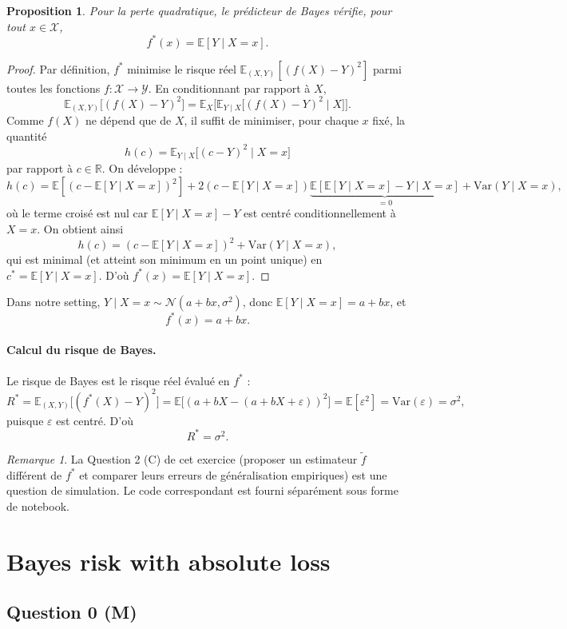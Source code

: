 \documentclass[11pt]{article}
\newtheorem{proposition}{Proposition}
\theoremstyle{remark}
\newtheorem*{remark}{Remarque}
\newcommand{\X}{\mathcal{X}}
\newcommand{\Y}{\mathcal{Y}}
\newcommand{\E}{\mathbb{E}}
\newcommand{\R}{\mathbb{R}}
\newcommand{\Var}{\mathrm{Var}}
\begin{document}
\begin{proposition}
Pour la perte quadratique, le prédicteur de Bayes vérifie, pour tout $x \in \X$,
\[
  f^*(x) = \E[Y \mid X = x].
\]
\end{proposition}

\begin{proof}
Par définition, $f^*$ minimise le risque réel $\E_{(X,Y)}[(f(X)-Y)^2]$ parmi toutes les fonctions $f : \X \to \Y$. En conditionnant par rapport à $X$,
\[
  \E_{(X,Y)}\big[(f(X)-Y)^2\big] = \E_X\Big[\E_{Y\mid X}\big[(f(X)-Y)^2 \mid X\big]\Big].
\]
Comme $f(X)$ ne dépend que de $X$, il suffit de minimiser, pour chaque $x$ fixé, la quantité
\[
  h(c) = \E_{Y\mid X}\big[(c-Y)^2 \mid X=x\big]
\]
par rapport à $c \in \R$. On développe :
\[
  h(c) = \E[(c - \E[Y\mid X=x])^2] + 2(c - \E[Y\mid X=x])\underbrace{\E[\E[Y\mid X=x] - Y \mid X=x]}_{=0} + \Var(Y\mid X=x),
\]
où le terme croisé est nul car $\E[Y \mid X=x] - Y$ est centré conditionnellement à $X=x$. On obtient ainsi
\[
  h(c) = (c - \E[Y\mid X=x])^2 + \Var(Y \mid X=x),
\]
qui est minimal (et atteint son minimum en un point unique) en $c^* = \E[Y \mid X=x]$. D'où $f^*(x) = \E[Y\mid X=x]$.
\end{proof}

Dans notre setting, $Y \mid X=x \sim \mathcal{N}(a+bx, \sigma^2)$, donc $\E[Y\mid X=x] = a+bx$, et
\[
  \boxed{f^*(x) = a + bx}.
\]

\paragraph{Calcul du risque de Bayes.}
Le risque de Bayes est le risque réel évalué en $f^*$ :
\[
  R^* = \E_{(X,Y)}\big[(f^*(X)-Y)^2\big] = \E\big[(a+bX - (a+bX+\varepsilon))^2\big] = \E[\varepsilon^2] = \Var(\varepsilon) = \sigma^2,
\]
puisque $\varepsilon$ est centré. D'où
\[
  \boxed{R^* = \sigma^2}.
\]

\bigskip
\begin{remark}
La Question 2 (C) de cet exercice (proposer un estimateur $\tilde f$ différent de $f^*$ et comparer leurs erreurs de généralisation empiriques) est une question de simulation. Le code correspondant est fourni séparément sous forme de notebook.
\end{remark}

\section{Bayes risk with absolute loss}

\subsection*{Question 0 (M)}
\end{document}
